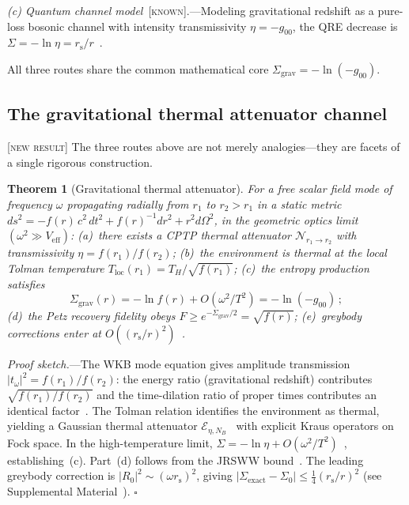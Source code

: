 \documentclass[prl,twocolumn,superscriptaddress,longbibliography,floatfix]{revtex4-2}
\newtheorem{theorem}{Theorem}
\newcommand{\chan}{\mathcal{N}}
\newcommand{\rs}{r_{\mathrm{s}}}
\newcommand{\Sgrav}{\Sigma_{\mathrm{grav}}}
\begin{document}
\emph{(c) Quantum channel model}~[\textsc{known}].---Modeling
gravitational redshift as a pure-loss bosonic channel with
intensity transmissivity $\eta = -g_{00}$, the QRE decrease
is $\Sigma = -\ln\eta = \rs/r$~\cite{AhmadiFuentes2014}.

All three routes share the common mathematical core
$\Sgrav = -\ln(-g_{00})$.

\subsection{The gravitational thermal attenuator channel}
\label{sec:grav_channel}

[\textsc{new result}]  The three routes above are not merely
analogies---they are facets of a single rigorous construction.

\begin{theorem}[Gravitational thermal attenuator]
\label{thm:grav_channel}
For a free scalar field mode of frequency $\omega$ propagating
radially from $r_1$ to $r_2 > r_1$ in a static metric
$ds^2 = -f(r)\,c^2\,dt^2 + f(r)^{-1}dr^2 + r^2 d\Omega^2$,
in the geometric optics limit
$(\omega^2 \gg V_{\mathrm{eff}})$:
\emph{(a)}~there exists a CPTP thermal attenuator
$\chan_{r_1 \to r_2}$ with transmissivity
$\eta = f(r_1)/f(r_2)$;
\emph{(b)}~the environment is thermal at the local Tolman
temperature $T_{\mathrm{loc}}(r_1) = T_H/\sqrt{f(r_1)}$;
\emph{(c)}~the entropy production satisfies
\begin{equation}
  \Sgrav(r) = -\ln f(r) + O(\omega^2/T^2)
  = -\ln(-g_{00})\,;
  \label{eq:Sgrav_channel}
\end{equation}
\emph{(d)}~the Petz recovery fidelity obeys
$F \geq e^{-\Sgrav/2} = \sqrt{f(r)}$;
\emph{(e)}~greybody corrections enter at
$O((\rs/r)^2)$~\cite{Wald1994}.
\end{theorem}

\emph{Proof sketch.}---The WKB mode equation gives amplitude
transmission $|t_\omega|^2 = f(r_1)/f(r_2)$: the energy ratio
(gravitational redshift) contributes $\sqrt{f(r_1)/f(r_2)}$
and the time-dilation ratio of proper times contributes an
identical factor~\cite{BirrellDavies1982}.
The Tolman relation identifies the environment as thermal,
yielding a Gaussian thermal attenuator
$\mathcal{E}_{\eta,N_B}$~\cite{IvanSabapathySimon2011} with
explicit Kraus operators on Fock space.
In the high-temperature limit,
$\Sigma = -\ln\eta + O(\omega^2/T^2)$~\cite{HolevoWerner2001},
establishing~(c).
Part~(d) follows from the JRSWW bound~\cite{JRSWW2018}.
The leading greybody correction is $|R_0|^2 \sim (\omega\rs)^2$,
giving $|\Sigma_{\mathrm{exact}} - \Sigma_0|
\leq \tfrac{1}{4}(\rs/r)^2$ (see Supplemental Material~\cite{supplement}).
\hfill$\square$
\end{document}
